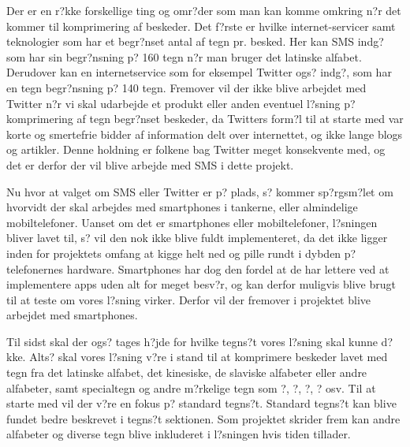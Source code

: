 Der er en r?kke forskellige ting og omr?der som man kan komme omkring n?r det kommer til komprimering af beskeder. Det f?rste er hvilke internet-servicer samt teknologier som har et begr?nset antal af tegn pr. besked. Her kan SMS indg? som har sin begr?nsning p? 160 tegn n?r man bruger det latinske alfabet\cite{Pro_1}. Derudover kan en internetservice som for eksempel Twitter ogs? indg?, som har en tegn begr?nsning p? 140 tegn\cite{pro_af1}. Fremover vil der ikke blive arbejdet med Twitter n?r vi skal udarbejde et produkt eller anden eventuel l?sning p? komprimering af tegn begr?nset beskeder, da Twitters form?l til at starte med var korte og smertefrie bidder af information delt over internettet, og ikke lange blogs og artikler. Denne holdning er folkene bag Twitter meget konsekvente med\cite{pro_af2}, og det er derfor der vil blive arbejde med SMS i dette projekt.

Nu hvor at valget om SMS eller Twitter er p? plads, s? kommer sp?rgsm?let om hvorvidt der skal arbejdes med smartphones i tankerne, eller almindelige mobiltelefoner. Uanset om det er smartphones eller mobiltelefoner, l?sningen bliver lavet til, s? vil den nok ikke blive fuldt implementeret, da det ikke ligger inden for projektets omfang at kigge helt ned og pille rundt i dybden p? telefonernes hardware. Smartphones har dog den fordel at de har lettere ved at implementere apps uden alt for meget besv?r, og kan derfor muligvis blive brugt til at teste om vores l?sning virker. Derfor vil der fremover i projektet blive arbejdet med smartphones.

Til sidst skal der ogs? tages h?jde for hvilke tegns?t vores l?sning skal kunne d?kke. Alts? skal vores l?sning v?re i stand til at komprimere beskeder lavet med tegn fra det latinske alfabet, det kinesiske, de slaviske alfabeter eller andre alfabeter, samt specialtegn og andre m?rkelige tegn som ?, ?, ?, ? osv. Til at starte med vil der v?re en fokus p? standard tegns?t. Standard tegns?t kan blive fundet bedre beskrevet i tegns?t sektionen. Som projektet skrider frem kan andre alfabeter og diverse tegn blive inkluderet i l?sningen hvis tiden tillader.